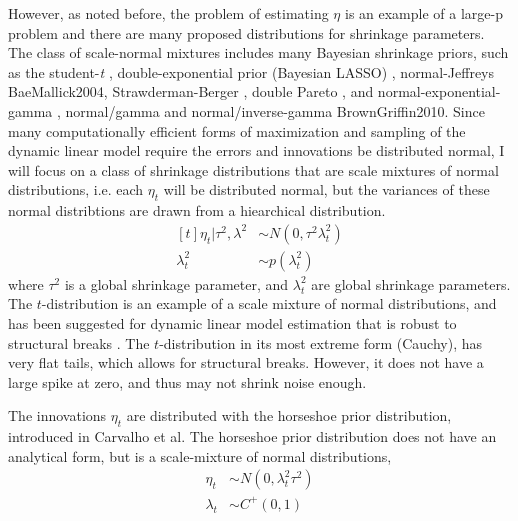 \documentclass{article}
\begin{document}
However, as noted before, the problem of estimating $\eta$ is an example of a large-p problem and there are many proposed distributions for shrinkage parameters.
The class of scale-normal mixtures includes many Bayesian shrinkage priors, such as the student-\textit{t} \parencite{Tipping2001}, double-exponential prior (Bayesian LASSO) \parencites{LiGoel2006}{ParkCasella2008}{Hans2009}, normal-Jeffreys \parencite{FigueiredoMember2003}{BaeMallick2004}, Strawderman-Berger \parencites{Strawderman1971}{Berger1980}, double Pareto \parencite{ArmaganDunsonLee2011},  and normal-exponential-gamma \parencite{BrownGriffin2005}, normal/gamma and normal/inverse-gamma \parencite{CaronDoucet2008}{BrownGriffin2010}.
Since many computationally efficient forms of maximization and sampling of the dynamic linear model require the errors and innovations be distributed normal, I will focus on a class of shrinkage distributions that are scale mixtures of normal distributions, i.e. each $\eta_{t}$ will be distributed normal, but the variances of these normal distribtions are drawn from a hiearchical distribution.
\begin{equation}
  \label{eq:6}
  \begin{aligned}[t]
    \eta_{t} | \tau^{2}, \lambda^{2} & \sim N(0, \tau^{2} \lambda_{t}^{2}) \\
    \lambda_{t}^{2} & \sim p(\lambda^{2}_{t})
  \end{aligned}
\end{equation}
where $\tau^{2}$ is a global shrinkage parameter, and $\lambda_{t}^{2}$ are global shrinkage parameters.
The $t$-distribution is an example of a scale mixture of normal distributions, and has been suggested for dynamic linear model estimation that is robust to structural breaks \parencites{HarveyKoopman2000}{PetrisPetroneEtAl2009}.
The $t$-distribution in its most extreme form (Cauchy), has very flat tails, which allows for structural breaks.
However, it does not have a large spike at zero, and thus may not shrink noise enough.

The innovations $\eta_{t}$ are distributed with the horseshoe prior distribution, introduced in Carvalho et al.
The horseshoe prior distribution does not have an analytical form, but is a scale-mixture of normal distributions,
\begin{align}
  \label{eq:12}
  \eta_{t} &\sim N(0, \lambda_{t}^{2} \tau^{2}) \\
  \label{eq:13}
  \lambda_{t} &\sim C^{+}(0, 1)
\end{align}
\end{document}
